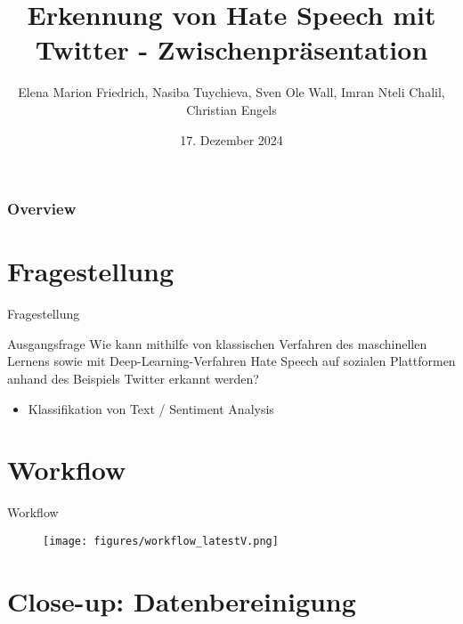 \documentclass[aspectratio=169]{beamer} %
\title{Erkennung von Hate Speech mit Twitter - Zwischenpr\"asentation}
\author[Friedrich, Tuychieva, Wall, Chalil, Engels]{Elena Marion Friedrich, Nasiba Tuychieva, Sven Ole Wall, Imran Nteli Chalil, Christian Engels}
\institute{Artificial Intelligence Group,\\
University of Hagen, Germany}
\date{17. Dezember 2024}
\begin{document}

\begin{frame}
  \titlepage
\end{frame}
\nologo

\begin{frame}
		\frametitle{Overview}
        \tableofcontents[]
\end{frame}

\section{Fragestellung}
\begin{frame}{Fragestellung}
    \begin{block}{Ausgangsfrage}
        Wie kann mithilfe von klassischen Verfahren des maschinellen Lernens sowie mit Deep-Learning-Verfahren Hate Speech auf sozialen Plattformen anhand des Beispiels Twitter erkannt werden?
        \begin{itemize}
            \item Klassifikation von Text / Sentiment Analysis
        \end{itemize}
    \end{block}    
\end{frame}


\section{Workflow}
\begin{frame}{Workflow}
 \begin{figure}[h!]
        \centering
        \texttt{[image: figures/workflow\_latestV.png]}
        \label{fig:yourimage}
    \end{figure}
\end{frame}


\section{Close-up: Datenbereinigung}
\end{document}
